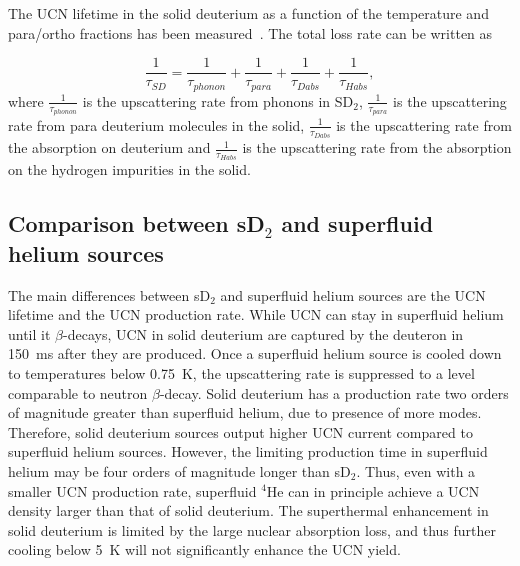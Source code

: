 The UCN lifetime in the solid deuterium as a function of the temperature
and para/ortho fractions has been measured~\cite{Morris2002}. The
total loss rate can be written as

\begin{equation}
\label{eqn:SD_lifetime}
\frac{1}{\tau_{SD}}=\frac{1}{\tau_{phonon}}+\frac{1}{\tau_{para}}+\frac{1}{\tau_{Dabs}}+ \frac{1}{\tau_{Habs}},
\end{equation}
where $\frac{1}{\tau_{phonon}}$ is the upscattering rate from phonons
in SD$_2$, $\frac{1}{\tau_{para}}$ is the upscattering rate from para
deuterium molecules in the solid, $\frac{1}{\tau_{Dabs}}$ is the
upscattering rate from the absorption on deuterium and
$\frac{1}{\tau_{Habs}}$ is the upscattering rate from the absorption
on the hydrogen impurities in the solid.





\subsection{Comparison between sD$_2$ and superfluid helium sources}

The main differences between sD$_2$ and superfluid helium sources are
the UCN lifetime and the UCN production rate. While UCN can stay in
superfluid helium until it $\beta$-decays, UCN in solid deuterium are
captured by the deuteron in 150~ms after they are produced.  Once a
superfluid helium source is cooled down to temperatures below 0.75~K,
the upscattering rate is suppressed to a level comparable to neutron
$\beta$-decay.  Solid deuterium has a production rate two orders of
magnitude greater than superfluid helium, due to presence of more
modes. Therefore, solid deuterium sources output higher UCN current
compared to superfluid helium sources. However, the limiting
production time in superfluid helium may be four orders of magnitude
longer than sD$_2$. Thus, even with a smaller UCN production rate,
superfluid $^4$He can in principle achieve a UCN density larger than
that of solid deuterium.  The superthermal enhancement in solid
deuterium is limited by the large nuclear absorption loss, and thus
further cooling below 5~K will not significantly enhance the UCN
yield.

